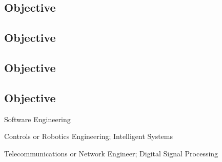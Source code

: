 \documentclass[margin]{res}
\begin{document}
 
 
 
\address{{\bf Present Address} \\ 4042 Powelton Avenue \#2 \\ Philadelphia, PA 19104  \\
        (215) 501-7891 }
\address{{\bf Permanent Address} \\ 1726 Reyburn Creek Road \\ Malvern, AR 72104 \\
        (501) 337-8485 }

\begin{resume} 

\begin{software}
\section{Objective}
\end{software}
\begin{controls}
\section{Objective}
\end{controls}
\begin{telecom}
\section{Objective}
\end{telecom}
\begin{educate}
\section{Objective}
\end{educate}

\begin{software}
Software Engineering
\end{software}

\begin{controls}
Controls or Robotics Engineering; Intelligent Systems
\end{controls}

\begin{telecom}
Telecommunications or Network Engineer; Digital Signal Processing
\end{telecom}


\end{resume}
\end{document}

